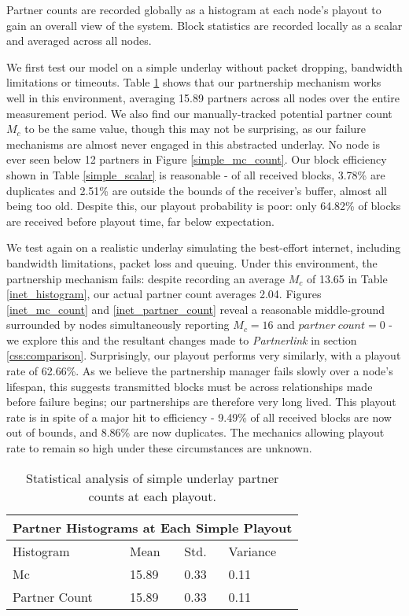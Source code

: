 \documentclass[12pt,a4paper]{article}
\begin{document}
Partner counts are recorded globally as a histogram at each node's playout to gain an overall view of the system. Block statistics are recorded locally as a scalar and averaged across all nodes.

We first test our model on a simple underlay without packet dropping, bandwidth limitations or timeouts. Table \ref{simple_histogram} shows that our partnership mechanism works well in this environment, averaging 15.89 partners across all nodes over the entire measurement period. We also find our manually-tracked potential partner count \(M_c\) to be the same value, though this may not be surprising, as our failure mechanisms are almost never engaged in this abstracted underlay. No node is ever seen below 12 partners in Figure \ref{simple_mc_count}. Our block efficiency shown in Table \ref{simple_scalar} is reasonable - of all received blocks, 3.78\% are duplicates and 2.51\% are outside the bounds of the receiver's buffer, almost all being too old. Despite this, our playout probability is poor: only 64.82\% of blocks are received before playout time, far below expectation.

We test again on a realistic underlay simulating the best-effort internet, including bandwidth limitations, packet loss and queuing. Under this environment, the partnership mechanism fails: despite recording an average \(M_c\) of 13.65 in Table \ref{inet_histogram}, our actual partner count averages 2.04. Figures \ref{inet_mc_count} and \ref{inet_partner_count} reveal a reasonable middle-ground surrounded by nodes simultaneously reporting \(M_c = 16\) and \(partner\ count = 0\) - we explore this and the resultant changes made to \textit{Partnerlink} in section \ref{css:comparison}. Surprisingly, our playout performs very similarly, with a playout rate of 62.66\%. As we believe the partnership manager fails slowly over a node's lifespan, this suggests transmitted blocks must be across relationships made before failure begins; our partnerships are therefore very long lived. This playout rate is in spite of a major hit to efficiency - 9.49\% of all received blocks are now out of bounds, and 8.86\% are now duplicates. The mechanics allowing playout rate to remain so high under these circumstances are unknown.

\begin{table}[h!]
	\centering
	\begin{tabular}{ |p{3cm}||p{3cm}|p{3cm}|p{3cm}|  }
		\hline
		\multicolumn{4}{|c|}{Partner Histograms at Each Simple Playout} \\
		\hline
		Histogram & Mean & Std. & Variance \\
		\hline
		Mc   & 15.89    & 0.33 &   0.11\\
		Partner Count &   15.89  & 0.33   & 0.11\\
		\hline
	\end{tabular} 
	\caption{Statistical analysis of simple underlay partner counts at each playout.}
	\label{simple_histogram}
\end{table}
\end{document}
